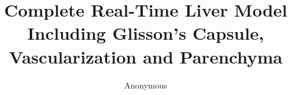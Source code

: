 \documentclass{llncs}
\begin{document}
%
%
\mainmatter              %
%
\title{Complete Real-Time Liver Model Including Glisson's Capsule, Vascularization and Parenchyma}
%
%
\author{Anonymous}
%
%
%
\maketitle
\end{document}
